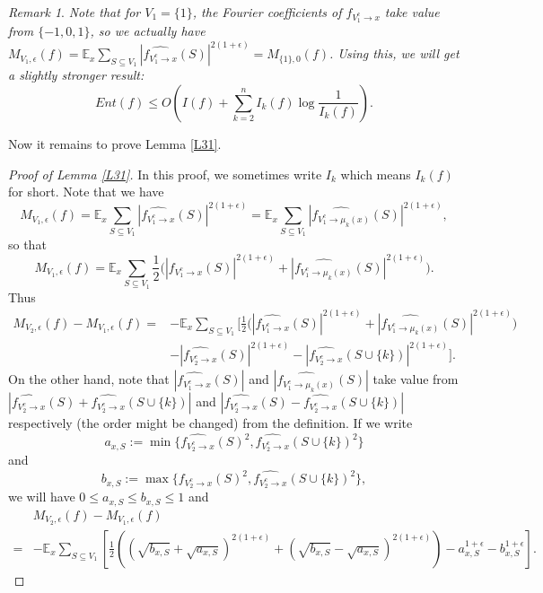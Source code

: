\documentclass[10pt]{article} \usepackage[utf8]{inputenc}
\theoremstyle{definition}
\theoremstyle{remark}
\newtheorem{rem}{Remark}[section]
\numberwithin{equation}{section}
\begin{document}
\begin{rem}
\emph{Note that for $V_1=\{1\}$, the Fourier coefficients of $f_{V_1^{c} \to x}$ take value from $\{-1, 0, 1\}$, so we actually have $M_{V_1,\epsilon}(f)=\mathbb{E}_x\sum_{S\subseteq V_1}{|\widehat{f_{V_1^{c} \to x}}(S)|^{2(1+\epsilon)}}=M_{\{1\},0}(f)$. Using this, we will get a slightly stronger result: 
$$Ent(f)\leq O(I(f)+\sum_{k=2}^n I_k(f)\log \frac{1}{I_k(f)}).$$}
\end{rem}
Now it remains to prove Lemma \ref{L31}.
\begin{proof}[Proof of Lemma \ref{L31}]
In this proof, we sometimes write $I_k$ which means $I_k(f)$ for short. Note that we have 
$$M_{V_1,\epsilon}(f)=\mathbb{E}_x\sum_{S\subseteq V_1}{|\widehat{f_{V_1^{c} \to x}}(S)|^{2(1+\epsilon)}}=\mathbb{E}_x\sum_{S\subseteq V_1}{|\widehat{f_{V_1^{c} \to \mu_k(x)}}(S)|^{2(1+\epsilon)}},$$ so that 
\begin{equation}
M_{V_1,\epsilon}(f)=\mathbb{E}_x \sum_{S\subseteq V_1}{\frac{1}{2}(|\widehat{f_{V_1^{c} \to x}}(S)|^{2(1+\epsilon)}+|\widehat{f_{V_1^{c} \to \mu_k(x)}}(S)|^{2(1+\epsilon)}}).
\end{equation}
Thus
\begin{equation}
\begin{aligned}
M_{V_2,\epsilon}(f)-M_{V_1,\epsilon}(f)= & -\mathbb{E}_x\sum_{S\subseteq V_1}{[\frac{1}{2}(|\widehat{f_{V_1^{c} \to x}}(S)|^{2(1+\epsilon)}+|\widehat{f_{V_1^{c} \to \mu_k(x)}}(S)|^{2(1+\epsilon)}}) \\
&-|\widehat{f_{V_2^{c} \to x}}(S)|^{2(1+\epsilon)}-|\widehat{f_{V_2^{c} \to x}}(S\cup \{k\})|^{2(1+\epsilon)}].
\end{aligned}
\end{equation}
On the other hand, note that $|\widehat{f_{V_1^{c} \to x}}(S)|$ and $|\widehat{f_{V_1^{c} \to \mu_k(x)}}(S)|$ take value from $|\widehat{f_{V_2^{c} \to x}}(S)+\widehat{f_{V_2^{c} \to x}}(S\cup \{k\})|$ and $|\widehat{f_{V_2^{c} \to x}}(S)-\widehat{f_{V_2^{c} \to x}}(S\cup \{k\})|$ respectively (the order might be changed) from the definition. If we write 
$$a_{x,S}:=\min\{\widehat{f_{V_2^{c} \to x}}(S)^2,\widehat{f_{V_2^{c} \to x}}(S\cup \{k\})^2\}$$ and $$b_{x,S}:=\max\{\widehat{f_{V_2^{c} \to x}}(S)^2,\widehat{f_{V_2^{c} \to x}}(S\cup \{k\})^2\},$$ we will have $0\leq a_{x,S} \leq b_{x,S} \leq 1$ and
\begin{equation}
\begin{aligned}
 & M_{V_2,\epsilon}(f)-M_{V_1,\epsilon}(f)\\
=& -\mathbb{E}_x\sum_{S\subseteq V_1}{[\frac{1}{2}((\sqrt{b_{x,S}}+\sqrt{a_{x,S}})^{2(1+\epsilon)}+(\sqrt{b_{x,S}}-\sqrt{a_{x,S}})^{2(1+\epsilon)})-a_{x,S}^{1+\epsilon}-b_{x,S}^{1+\epsilon}]}.

\end{aligned}
\end{equation}
\end{proof}
\end{document}
